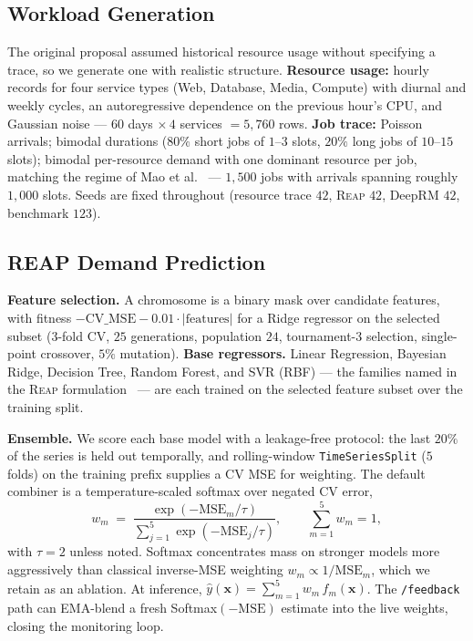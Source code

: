 \documentclass[runningheads]{llncs}
\newcommand{\reap}{\textsc{Reap}}
\begin{document}
\subsection{Workload Generation}\label{sec:data}
The original proposal assumed historical resource usage without
specifying a trace, so we generate one with realistic structure.
\textbf{Resource usage:} hourly records for four service types (Web,
Database, Media, Compute) with diurnal and weekly cycles, an
autoregressive dependence on the previous hour's CPU, and Gaussian
noise --- $60$ days $\times\,4$ services $=5{,}760$ rows.
\textbf{Job trace:} Poisson arrivals; bimodal durations ($80\%$ short
jobs of $1$--$3$ slots, $20\%$ long jobs of $10$--$15$ slots); bimodal
per-resource demand with one dominant resource per job, matching the
regime of Mao et al.~\cite{mao2016} --- $1{,}500$ jobs with arrivals
spanning roughly $1{,}000$ slots. Seeds are fixed throughout (resource
trace $42$, \reap{} $42$, DeepRM $42$, benchmark $123$).

\subsection{REAP Demand Prediction}\label{sec:reap}
\textbf{Feature selection.} A chromosome is a binary mask over
candidate features, with fitness
$-\mathrm{CV\_MSE}-0.01\cdot|\text{features}|$ for a Ridge regressor on
the selected subset ($3$-fold CV, $25$ generations, population $24$,
tournament-$3$ selection, single-point crossover, $5\%$ mutation).
\textbf{Base regressors.} Linear Regression, Bayesian Ridge, Decision
Tree, Random Forest, and SVR (RBF) --- the families named in the \reap{}
formulation~\cite{kaur2019} --- are each trained on the selected feature
subset over the training split.

\textbf{Ensemble.} We score each base model with a leakage-free
protocol: the last $20\%$ of the series is held out temporally, and
rolling-window \texttt{TimeSeriesSplit} ($5$ folds) on the training
prefix supplies a CV MSE for weighting. The default combiner is a
temperature-scaled softmax over negated CV error,
\begin{equation}
w_m \;=\; \frac{\exp(-\mathrm{MSE}_m/\tau)}{\sum_{j=1}^{5}
\exp(-\mathrm{MSE}_j/\tau)},
\qquad \sum_{m=1}^{5} w_m = 1,
\label{eq:weights}
\end{equation}
with $\tau{=}2$ unless noted. Softmax concentrates mass on stronger
models more aggressively than classical inverse-MSE weighting
$w_m\propto 1/\mathrm{MSE}_m$, which we retain as an ablation. At
inference,
$\hat{y}(\mathbf{x}) = \sum_{m=1}^{5} w_m\, f_m(\mathbf{x})$. The
\texttt{/feedback} path can EMA-blend a fresh Softmax$(-\mathrm{MSE})$
estimate into the live weights, closing the monitoring loop.
\end{document}
